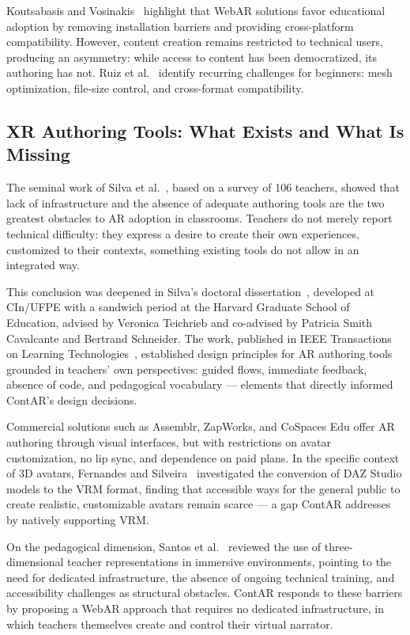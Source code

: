 \documentclass[conference]{IEEEtran}
\begin{document}
Koutsabasis and Vosinakis~\cite{koutsabasis2021} highlight that WebAR
solutions favor educational adoption by removing installation barriers and
providing cross-platform compatibility. However, content creation remains
restricted to technical users, producing an asymmetry: while access to
content has been democratized, its authoring has not. Ruiz et
al.~\cite{ruiz2020} identify recurring challenges for beginners: mesh
optimization, file-size control, and cross-format compatibility.

\subsection{XR Authoring Tools: What Exists and What Is Missing}

The seminal work of Silva et al.~\cite{silva2020}, based on a survey of 106
teachers, showed that lack of infrastructure and the absence of adequate
authoring tools are the two greatest obstacles to AR adoption in classrooms.
Teachers do not merely report technical difficulty: they express a desire to
create their own experiences, customized to their contexts, something
existing tools do not allow in an integrated way.

This conclusion was deepened in Silva's doctoral dissertation~\cite{silva2022},
developed at CIn/UFPE with a sandwich period at the Harvard Graduate School of
Education, advised by Veronica Teichrieb and co-advised by Patricia Smith
Cavalcante and Bertrand Schneider. The work, published in IEEE Transactions on
Learning Technologies~\cite{silva2023}, established design principles for AR
authoring tools grounded in teachers' own perspectives: guided flows,
immediate feedback, absence of code, and pedagogical vocabulary — elements
that directly informed ContAR's design decisions.

Commercial solutions such as Assemblr, ZapWorks, and CoSpaces Edu offer AR
authoring through visual interfaces, but with restrictions on avatar
customization, no lip sync, and dependence on paid plans. In the specific
context of 3D avatars, Fernandes and Silveira~\cite{fernandes2025}
investigated the conversion of DAZ Studio models to the VRM format, finding
that accessible ways for the general public to create realistic, customizable
avatars remain scarce — a gap ContAR addresses by natively supporting VRM.

On the pedagogical dimension, Santos et al.~\cite{santos2025} reviewed the use
of three-dimensional teacher representations in immersive environments,
pointing to the need for dedicated infrastructure, the absence of ongoing
technical training, and accessibility challenges as structural obstacles.
ContAR responds to these barriers by proposing a WebAR approach that requires
no dedicated infrastructure, in which teachers themselves create and control
their virtual narrator.
\end{document}
